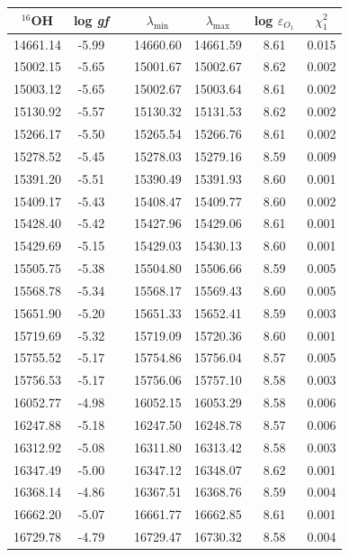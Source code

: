 \documentclass{article}
\begin{document}
  \begin{table}[h!]
    
    \begin{center}
      \vfill
        \begin{tabular}{ccccccc}
        \hline
        \hline
        $^{16}$OH &log \textit{gf}&& $\lambda_{\mathrm{min}}$ & $\lambda_{\mathrm{max}}$ & log $\varepsilon_{O_1}$& $\chi^2_1$\\
        \hline
        14661.14 & -5.99& & 14660.60&14661.59& 8.61&0.015\\
15002.15 & -5.65& & 15001.67&15002.67& 8.62&0.002\\
15003.12 & -5.65& & 15002.67&15003.64& 8.61&0.002\\
15130.92 & -5.57& & 15130.32&15131.53& 8.62&0.002\\
15266.17 & -5.50& & 15265.54&15266.76& 8.61&0.002\\
15278.52 & -5.45& & 15278.03&15279.16& 8.59&0.009\\
15391.20 & -5.51& & 15390.49&15391.93& 8.60&0.001\\
15409.17 & -5.43& & 15408.47&15409.77& 8.60&0.002\\
15428.40 & -5.42& & 15427.96&15429.06& 8.61&0.001\\
15429.69 & -5.15& & 15429.03&15430.13& 8.60&0.001\\
15505.75 & -5.38& & 15504.80&15506.66& 8.59&0.005\\
15568.78 & -5.34& & 15568.17&15569.43& 8.60&0.005\\
15651.90 & -5.20& & 15651.33&15652.41& 8.59&0.003\\
15719.69 & -5.32& & 15719.09&15720.36& 8.60&0.001\\
15755.52 & -5.17& & 15754.86&15756.04& 8.57&0.005\\
15756.53 & -5.17& & 15756.06&15757.10& 8.58&0.003\\
16052.77 & -4.98& & 16052.15&16053.29& 8.58&0.006\\
16247.88 & -5.18& & 16247.50&16248.78& 8.57&0.006\\
16312.92 & -5.08& & 16311.80&16313.42& 8.58&0.003\\
16347.49 & -5.00& & 16347.12&16348.07& 8.62&0.001\\
16368.14 & -4.86& & 16367.51&16368.76& 8.59&0.004\\
16662.20 & -5.07& & 16661.77&16662.85& 8.61&0.001\\
16729.78 & -4.79& & 16729.47&16730.32& 8.58&0.004\\

\end{tabular}
\end{center}
\end{table}
\end{document}
